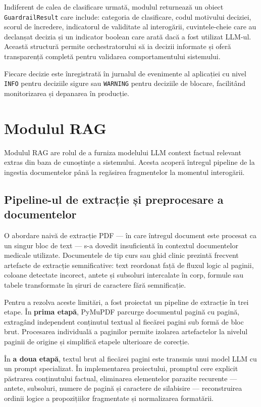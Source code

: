 \documentclass[12pt, a4paper, oneside, romanian]{teza-upb}
\begin{document}
Indiferent de calea de clasificare urmată, modulul returnează un obiect \texttt{GuardrailResult} care include: categoria de clasificare, codul motivului deciziei, scorul de încredere, indicatorul de validitate al interogării, cuvintele-cheie care au declanșat decizia și un indicator boolean care arată dacă a fost utilizat LLM-ul. Această structură permite orchestratorului să ia decizii informate și oferă transparență completă pentru validarea comportamentului sistemului.


Fiecare decizie este înregistrată în jurnalul de evenimente al aplicației cu nivel \texttt{INFO} pentru deciziile sigure sau \texttt{WARNING} pentru deciziile de blocare, facilitând monitorizarea și depanarea în producție.

\section{Modulul RAG}

Modulul RAG are rolul de a furniza modelului LLM context factual relevant extras din baza de cunoștințe a sistemului. Acesta acoperă întregul pipeline de la ingestia documentelor până la regăsirea fragmentelor la momentul interogării.

\subsection{Pipeline-ul de extracție și preprocesare a documentelor}

O abordare naivă de extracție PDF — în care întregul document este procesat ca un singur bloc de text — s-a dovedit insuficientă în contextul documentelor medicale utilizate. Documentele de tip curs sau ghid clinic prezintă frecvent artefacte de extracție semnificative: text reordonat față de fluxul logic al paginii, coloane detectate incorect, antete și subsoluri intercalate în corp, formule sau tabele transformate în șiruri de caractere fără semnificație.

Pentru a rezolva aceste limitări, a fost proiectat un pipeline de extracție în trei etape. În \textbf{prima etapă}, PyMuPDF parcurge documentul pagină cu pagină, extragând independent conținutul textual al fiecărei pagini sub formă de bloc brut. Procesarea individuală a paginilor permite izolarea artefactelor la nivelul paginii de origine și simplifică etapele ulterioare de corecție.

În \textbf{a doua etapă}, textul brut al fiecărei pagini este transmis unui model LLM cu un prompt specializat. În implementarea proiectului, promptul cere explicit păstrarea conținutului factual, eliminarea elementelor parazite recurente — antete, subsoluri, numere de pagină și caractere de silabisire — reconstruirea ordinii logice a propozițiilor fragmentate și normalizarea formatării.
\end{document}
